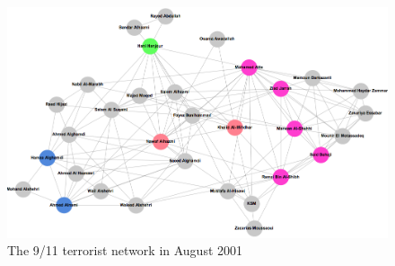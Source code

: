 \begin{subappendices}
\begin{figure}[h]
\begin{center}
\includegraphics[scale=0.4]{imgs/T2001-08.png}
\end{center}
\caption{The 9/11 terrorist network in August 2001}
\label{Terrorist-Aug01}
\end{figure}

\newpage


\end{subappendices}
